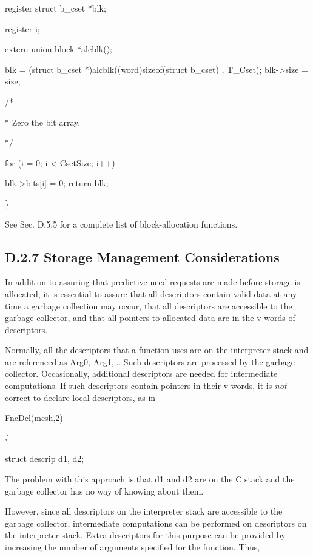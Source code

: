{\ttfamily\mdseries
register struct b\_cset *blk;}

{\ttfamily\mdseries
register i;}

{\ttfamily\mdseries
extern union block *alcblk();}

{\ttfamily\mdseries
blk = (struct b\_cset *)alcblk((word)sizeof(struct b\_cset) , T\_Cset); blk-{\textgreater}size = size;}

{\ttfamily\mdseries
/*}

{\ttfamily\mdseries
* Zero the bit array.}

{\ttfamily\mdseries
*/}

{\ttfamily\mdseries
for (i = 0; i {\textless} CsetSize; i++)}

{\ttfamily\mdseries
blk-{\textgreater}bits[i] = 0; return blk;}


\}


See Sec. D.5.5 for a complete list of block-allocation functions.

\subsection{D.2.7 Storage Management Considerations}

In addition to assuring that predictive need requests are made before
storage is allocated, it is essential to assure that all descriptors
contain valid data at any time a garbage collection may occur, that
all descriptors are accessible to the garbage collector, and that all
pointers to allocated data are in the v-words of descriptors.

Normally, all the descriptors that a function uses are on the
interpreter stack and are referenced as Arg0, Arg1,... Such
descriptors are processed by the garbage collector. Occasionally,
additional descriptors are needed for intermediate computations. If
such descriptors contain pointers in their v-words, it is \textit{not}
correct to declare local descriptors, as in

{\ttfamily\mdseries
FncDcl(mesh,2)}

{\ttfamily\mdseries
\{}

{\ttfamily\mdseries
struct descrip d1, d2;}


The problem with this approach is that d1 and d2 are on the C stack
and the garbage collector has no way of knowing about them.

However, since all descriptors on the interpreter stack are accessible
to the garbage collector, intermediate computations can be performed
on descriptors on the interpreter stack. Extra descriptors for this
purpose can be provided by increasing the number of arguments
specified for the function. Thus,

